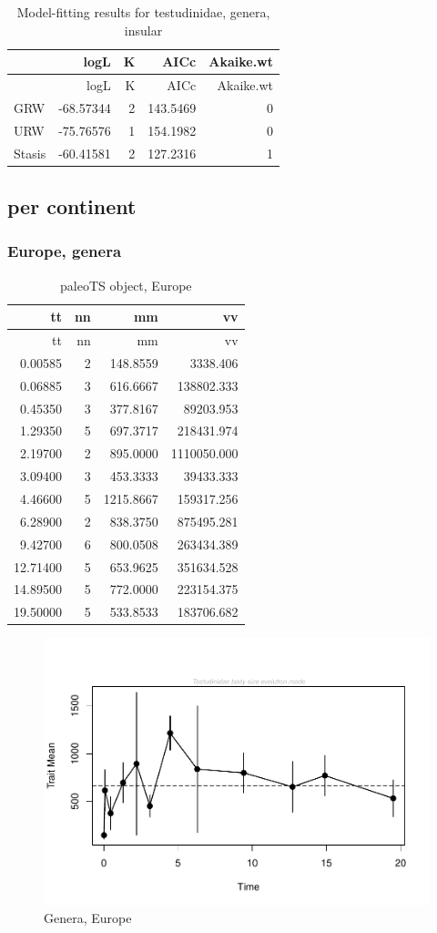 \documentclass[]{article}
\begin{document}
\begin{longtable}[]{@{}lrrrr@{}}
\caption{Model-fitting results for testudinidae, genera,
insular}\tabularnewline
\toprule
& logL & K & AICc & Akaike.wt\tabularnewline
\midrule
\endfirsthead
\toprule
& logL & K & AICc & Akaike.wt\tabularnewline
\midrule
\endhead
GRW & -68.57344 & 2 & 143.5469 & 0\tabularnewline
URW & -75.76576 & 1 & 154.1982 & 0\tabularnewline
Stasis & -60.41581 & 2 & 127.2316 & 1\tabularnewline
\bottomrule
\end{longtable}

\newpage

\subsection{per continent}\label{per-continent}

\subsubsection{Europe, genera}\label{europe-genera}

\begin{longtable}[]{@{}rrrr@{}}
\caption{paleoTS object, Europe}\tabularnewline
\toprule
tt & nn & mm & vv\tabularnewline
\midrule
\endfirsthead
\toprule
tt & nn & mm & vv\tabularnewline
\midrule
\endhead
0.00585 & 2 & 148.8559 & 3338.406\tabularnewline
0.06885 & 3 & 616.6667 & 138802.333\tabularnewline
0.45350 & 3 & 377.8167 & 89203.953\tabularnewline
1.29350 & 5 & 697.3717 & 218431.974\tabularnewline
2.19700 & 2 & 895.0000 & 1110050.000\tabularnewline
3.09400 & 3 & 453.3333 & 39433.333\tabularnewline
4.46600 & 5 & 1215.8667 & 159317.256\tabularnewline
6.28900 & 2 & 838.3750 & 875495.281\tabularnewline
9.42700 & 6 & 800.0508 & 263434.389\tabularnewline
12.71400 & 5 & 653.9625 & 351634.528\tabularnewline
14.89500 & 5 & 772.0000 & 223154.375\tabularnewline
19.50000 & 5 & 533.8533 & 183706.682\tabularnewline
\bottomrule
\end{longtable}

\begin{figure}[htbp]
\centering
\includegraphics{MA_JJ_files/figure-latex/paleoTSEurope-1.pdf}
\caption{Genera, Europe}
\end{figure}
\end{document}
